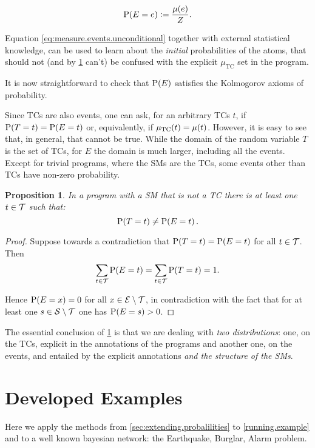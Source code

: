 \documentclass[adraft,copyright,creativecommons]{eptcs}
\newtheorem{proposition}{Proposition}
\newcommand{\at}[1]{\ensuremath{\!\del{#1}}}
\newcommand{\fml}[1]{\ensuremath{{\cal #1}}}
\newcommand{\pr}[1]{\ensuremath{\mathrm{P}\at{#1}}}
\newcommand{\pw}[1]{\ensuremath{\mu\at{#1}}}
\newcommand{\pwcfname}{\ensuremath{\mu_{\textrm{TC}}}}
\newcommand{\pwc}[1]{\ensuremath{\pwcfname\at{#1}}}
\begin{document}
\begin{equation}
    \pr{E = e} := \frac{\pw{e}}{Z}.\label{eq:probability.event}
\end{equation}

Equation \eqref{eq:measure.events.unconditional} together with external statistical knowledge, can be used to learn about the \emph{initial} probabilities of the atoms, that should not (and by \cref{prop:two.distributions} can't) be confused with the explicit $\pwcfname$ set in the program.

It is now straightforward to check that $\pr{E}$ satisfies the Kolmogorov axioms of probability.

Since \aclp{TC} are also events, one can ask, for an arbitrary \aclp{TC}  $t$, if $\pr{T = t} = \pr{E = t}$ or, equivalently, if $\pwc{t} = \pw{t}$.  However, it is easy to see that, in general, that cannot be true. While the domain of the random variable $T$ is the set of \aclp{TC}, for $E$ the domain is much larger, including all the events. Except for trivial programs, where the \acp{SM} are the \acp{TC}, some events other than \aclp{TC} have non-zero probability.

\begin{proposition} \label{prop:two.distributions}
    In a program with a \acl{SM} that is not a \acl{TC} there is at least one $t\in\fml{T}$ such that:
    \begin{equation}
        \pr{T = t} \not= \pr{E = t}. \label{eq:two.distributions}
    \end{equation}
\end{proposition}

\begin{proof}
    Suppose towards a contradiction that $\pr{T = t} = \pr{E = t}$ for all $t \in \fml{T}$.  Then
    $$
        \sum_{t\in\fml{T}} \pr{E = t} = \sum_{t\in\fml{T}} \pr{T = t} = 1.
    $$

    Hence $\pr{E = x} = 0$ for all $x \in \fml{E}\setminus\fml{T}$, in contradiction with the fact that for at least one $s \in \fml{S}\setminus\fml{T}$ one has $\pr{E = s} > 0$.
\end{proof}

The essential conclusion of \cref{prop:two.distributions} is that we are dealing with \emph{two distributions}: one, on the \acp{TC}, explicit in the annotations of the programs and another one, on the events, and entailed by the explicit annotations \emph{and the structure of the \aclp{SM}}.

%
%
%
\section{Developed Examples}\label{sec:developed.examples}
%
%
%
Here we apply the methods from \cref{sec:extending.probalilities} to \cref{running.example} and to a well known bayesian network: the Earthquake, Burglar, Alarm problem.
\end{document}
